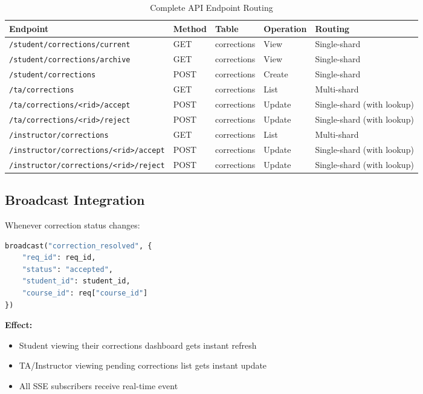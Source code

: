 \documentclass[conference]{IEEEtran}
\begin{document}
\begin{table}[htbp]
\caption{Complete API Endpoint Routing}
\centering
\begin{tabular}{|l|l|l|l|l|}
\hline
\textbf{Endpoint} & \textbf{Method} & \textbf{Table} & \textbf{Operation} & \textbf{Routing} \\
\hline
\texttt{/student/corrections/current} & GET & corrections & View & Single-shard \\
\hline
\texttt{/student/corrections/archive} & GET & corrections & View & Single-shard \\
\hline
\texttt{/student/corrections} & POST & corrections & Create & Single-shard \\
\hline
\texttt{/ta/corrections} & GET & corrections & List & Multi-shard \\
\hline
\texttt{/ta/corrections/<rid>/accept} & POST & corrections & Update & Single-shard (with lookup) \\
\hline
\texttt{/ta/corrections/<rid>/reject} & POST & corrections & Update & Single-shard (with lookup) \\
\hline
\texttt{/instructor/corrections} & GET & corrections & List & Multi-shard \\
\hline
\texttt{/instructor/corrections/<rid>/accept} & POST & corrections & Update & Single-shard (with lookup) \\
\hline
\texttt{/instructor/corrections/<rid>/reject} & POST & corrections & Update & Single-shard (with lookup) \\
\hline
\end{tabular}
\label{tab:correction_routing}
\end{table}

\subsection{Broadcast Integration}

Whenever correction status changes:

\begin{lstlisting}[language=Python]
broadcast("correction_resolved", {
    "req_id": req_id,
    "status": "accepted",
    "student_id": student_id,
    "course_id": req["course_id"]
})
\end{lstlisting}

\textbf{Effect:}
\begin{itemize}
    \item Student viewing their corrections dashboard gets instant refresh
    \item TA/Instructor viewing pending corrections list gets instant update
    \item All SSE subscribers receive real-time event
\end{itemize}
\end{document}
